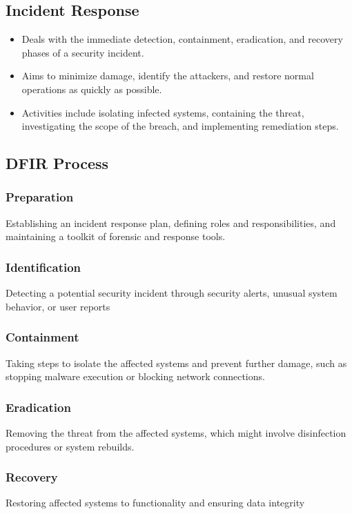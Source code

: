 \documentclass[a4paper, 11pt, oneside]{article} %
\begin{document}
\subsection{Incident Response}
\begin{itemize}
    \item Deals with the immediate detection, containment, eradication, and recovery phases of a security incident.
    \item Aims to minimize damage, identify the attackers, and restore normal operations as quickly as possible.
    \item Activities include isolating infected systems, containing the threat, investigating the scope of the breach, and implementing remediation steps.
\end{itemize}

\subsection{DFIR Process}

\subsubsection{Preparation}
Establishing an incident response plan, defining roles and responsibilities, and maintaining a toolkit of forensic and response tools.

\subsubsection{Identification}
 Detecting a potential security incident through security alerts, unusual system behavior, or user reports
 
\subsubsection{Containment}
Taking steps to isolate the affected systems and prevent further damage, such as stopping malware execution or blocking network connections.
  
\subsubsection{Eradication}
Removing the threat from the affected systems, which might involve disinfection procedures or system rebuilds.
    
\subsubsection{Recovery}
Restoring affected systems to functionality and ensuring data integrity
    
\end{document}
